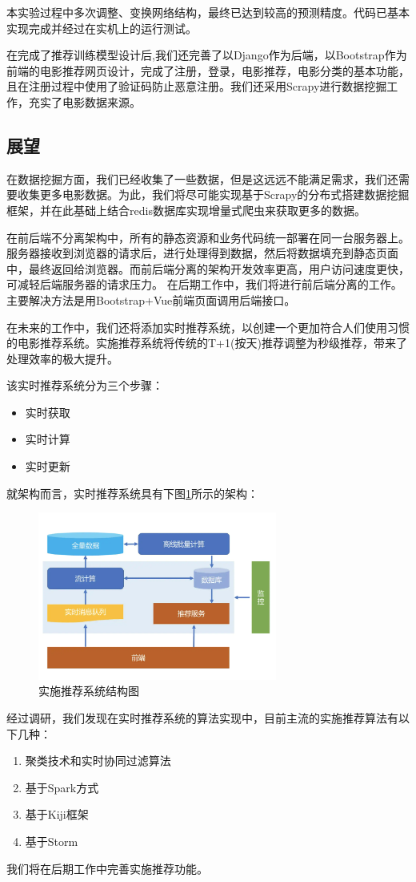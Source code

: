 \documentclass{ctexart}
\begin{document}
本实验过程中多次调整、变换网络结构，最终已达到较高的预测精度。代码已基本实现完成并经过在实机上的运行测试。

在完成了推荐训练模型设计后,我们还完善了以Django作为后端，以Bootstrap作为前端的电影推荐网页设计，完成了注册，登录，电影推荐，电影分类的基本功能，且在注册过程中使用了验证码防止恶意注册。我们还采用Scrapy进行数据挖掘工作，充实了电影数据来源。
\subsection{展望}
在数据挖掘方面，我们已经收集了一些数据，但是这远远不能满足需求，我们还需要收集更多电影数据。为此，我们将尽可能实现基于Scrapy的分布式搭建数据挖掘框架，并在此基础上结合redis数据库实现增量式爬虫来获取更多的数据。

在前后端不分离架构中，所有的静态资源和业务代码统一部署在同一台服务器上。服务器接收到浏览器的请求后，进行处理得到数据，然后将数据填充到静态页面中，最终返回给浏览器。而前后端分离的架构开发效率更高，用户访问速度更快，可减轻后端服务器的请求压力。
在后期工作中，我们将进行前后端分离的工作。主要解决方法是用Bootstrap+Vue前端页面调用后端接口。

在未来的工作中，我们还将添加实时推荐系统，以创建一个更加符合人们使用习惯的电影推荐系统。实施推荐系统将传统的T+1(按天)推荐调整为秒级推荐，带来了处理效率的极大提升。

该实时推荐系统分为三个步骤：
\begin{itemize}
    \item 实时获取
    \item 实时计算
    \item 实时更新
\end{itemize}

就架构而言，实时推荐系统具有下图\ref{post}所示的架构：

\begin {figure}[h]
\centering %
\includegraphics[width=0.7\textwidth]{post.png}
\caption{实施推荐系统结构图} %
\label{post}
\end {figure}

经过调研，我们发现在实时推荐系统的算法实现中，目前主流的实施推荐算法有以下几种：
\begin{enumerate}
    \item 聚类技术和实时协同过滤算法
    \item 基于Spark方式
    \item 基于Kiji框架
    \item 基于Storm
\end{enumerate}

我们将在后期工作中完善实施推荐功能。
\end{document}

